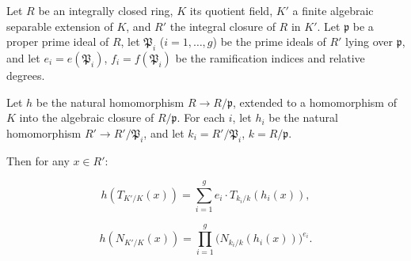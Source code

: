 Let $R$ be an integrally closed ring, $K$ its quotient field, $K'$ a finite algebraic separable extension of $K$, and $R'$ the integral closure of $R$ in $K'$. Let $\mathfrak{p}$ be a proper prime ideal of $R$, let $\mathfrak{P}_i$ ($i = 1, \ldots, g$) be the prime ideals of $R'$ lying over $\mathfrak{p}$, and let $e_i = e(\mathfrak{P}_i)$, $f_i = f(\mathfrak{P}_i)$ be the ramification indices and relative degrees.

Let $h$ be the natural homomorphism $R \to R/\mathfrak{p}$, extended to a homomorphism of $K$ into the algebraic closure of $R/\mathfrak{p}$. For each $i$, let $h_i$ be the natural homomorphism $R' \to R'/\mathfrak{P}_i$, and let $k_i = R'/\mathfrak{P}_i$, $k = R/\mathfrak{p}$.

Then for any $x \in R'$:

$$h(T_{K'/K}(x)) = \sum_{i=1}^{g} e_i \cdot T_{k_i/k}(h_i(x)),$$

$$h(N_{K'/K}(x)) = \prod_{i=1}^{g} \bigl(N_{k_i/k}(h_i(x))\bigr)^{e_i}.$$

